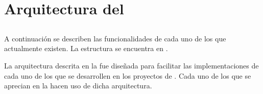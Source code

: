 \section{Arquitectura del \frameworkPC}\label{cap:arquitectura:section:arquitectura_framework}

	\subsection{\packagesAS}

		A continuación se describen las funcionalidades de cada uno de los \packagesAS que actualmente existen. La estructura se encuentra en .

		

			


		La arquitectura descrita en la  fue diseñada para facilitar las implementaciones de cada uno de los \packagesAS que se desarrollen en los proyectos de \meteorNAME. Cada uno de los \packagesAS que se aprecian en la  hacen uso de dicha arquitectura.

